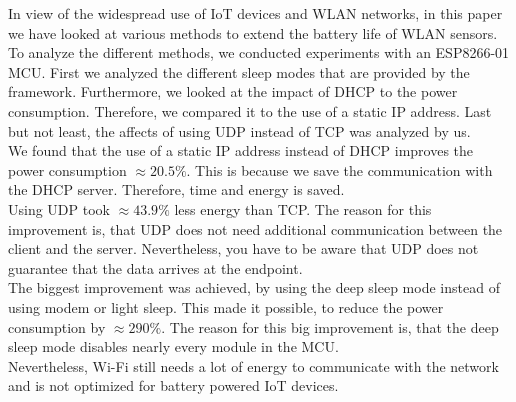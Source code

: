 In view of the widespread use of IoT devices and WLAN networks, in this paper we have looked at various methods to extend the battery life of WLAN sensors.
To analyze the different methods, we conducted experiments with an ESP8266-01 MCU.
First we analyzed the different sleep modes that are provided by the framework. 
Furthermore, we looked at the impact of DHCP to the power consumption. Therefore, we compared it to the use of a static IP address.
Last but not least, the affects of using UDP instead of TCP was analyzed by us.
\\
We found that the use of a static IP address instead of DHCP improves the power consumption $\approx 20.5\%$.
This is because we save the communication with the DHCP server. Therefore, time and energy is saved.
\\
Using UDP took $\approx 43.9\%$ less energy than TCP. 
The reason for this improvement is, that UDP does not need additional communication between the client and the server.
Nevertheless, you have to be aware that UDP does not guarantee that the data arrives at the endpoint.
\\
The biggest improvement was achieved, by using the deep sleep mode instead of using modem or light sleep.
This made it possible, to reduce the power consumption by $\approx 290\%$.
The reason for this big improvement is, that the deep sleep mode disables nearly every module in the MCU.
\\
Nevertheless, Wi-Fi still needs a lot of energy to communicate with the network and is not optimized for battery powered IoT devices. \cite{spachos_power_2017}

